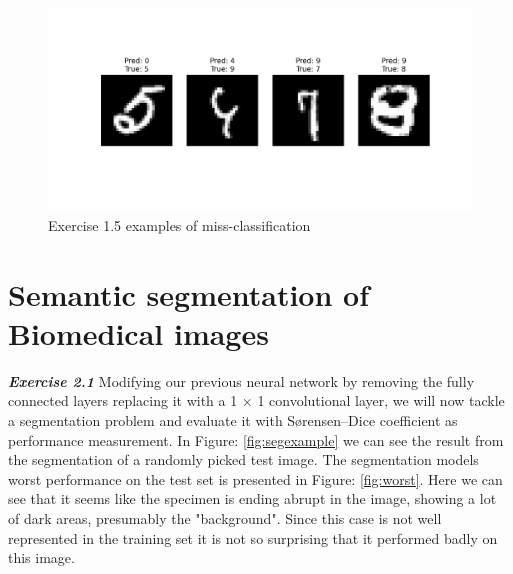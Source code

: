\documentclass[a4paper,10pt]{article}
\begin{document}
\begin{figure}[ht!]
\centering
\includegraphics[width=120mm]{figures/assignment_3/convnet_missclassification.png}
\caption{Exercise 1.5 examples of miss-classification}
\label{fig:missclass}
\end{figure}


\newpage

\section{Semantic segmentation of Biomedical images}

\textit{\textbf{Exercise 2.1}} Modifying our previous neural network by removing the fully connected layers replacing it with a 1 $\times$ 1 convolutional layer, we will now tackle a segmentation problem and evaluate it with Sørensen–Dice coefficient as performance measurement. In Figure: \ref{fig:segexample} we can see the result from the segmentation of a randomly picked test image. The segmentation models worst performance on the test set is presented in Figure: \ref{fig:worst}. Here we can see that it seems like the specimen is ending abrupt in the image, showing a lot of dark areas, presumably the "background". Since this case is not well represented in the training set it is not so surprising that it performed badly on this image. 
\end{document}
